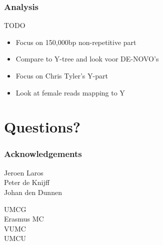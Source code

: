 \documentclass[slidestop,14pt]{beamer}
\begin{document}

\begin{frame}
  \frametitle{Analysis}

  \vspace{\baselineskip}

  TODO

  \vspace{\baselineskip}

  \begin{itemize}
    \item Focus on 150,000bp non-repetitive part
    \item Compare to Y-tree and look voor DE-NOVO's
    \item Focus on Chris Tyler's Y-part
    \item Look at female reads mapping to Y
  \end{itemize}
\end{frame}

\section{Questions?}


\lastpagetemplate
\begin{frame}
  \frametitle{Acknowledgements}

  \vspace{\baselineskip}

  Jeroen Laros\\
  Peter de Knijff\\
  Johan den Dunnen

  \vspace{\baselineskip}

  UMCG\\
  Erasmus MC\\
  VUMC\\
  UMCU
\end{frame}
\end{document}
